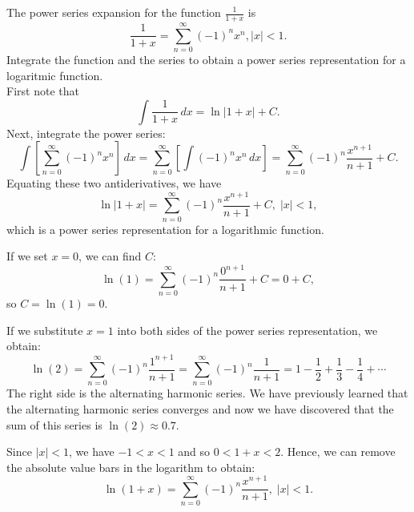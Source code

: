\documentclass[handout]{ximera}
\begin{document}
\begin{example}[example 2]
The power series expansion for the function $\frac{1}{1+x}$ is 
\[
\frac{1}{1+x} = \sum_{n=0}^\infty (-1)^n x^n, |x| < 1.
\]
Integrate the function and the series to obtain a power series representation for a logaritmic function.\\
First note that
\[
\int \frac{1}{1+x} \, dx = \ln|1+x| + C.
\]
Next, integrate the power series:
\[
\int \left[\sum_{n=0}^\infty (-1)^n x^n \right] \, dx =  \sum_{n=0}^\infty \left[ \int(-1)^n x^n \, dx \right] = \sum_{n=0}^\infty  (-1)^n \frac{x^{n+1}}{n+1} +C.
\]
Equating these two antiderivatives, we have
\[
\ln|1+x| = \sum_{n=0}^\infty  (-1)^n \frac{x^{n+1}}{n+1} +C, \; |x| < 1,
\]
which is a power series representation for a logarithmic function.

\begin{remark}[Remark 1]
If we set $x = 0$, we can find $C$:
\[
\ln(1) = \sum_{n=0}^\infty  (-1)^n \frac{0^{n+1}}{n+1} +C = 0 + C,
\]
so $C = \ln(1) = 0$.
\end{remark}

\begin{remark}[Remark 2]
If we substitute $x = 1$ into both sides of the power series representation, we obtain:
\[
\ln(2) = \sum_{n=0}^\infty  (-1)^n \frac{1^{n+1}}{n+1} = \sum_{n=0}^\infty  (-1)^n \frac{1}{n+1} = 1 - \frac12 + \frac13 - \frac14 + \cdots
\]
The right side is the alternating harmonic series. We have previously learned that the alternating harmonic series converges 
and now we have discovered that the sum of this series is $\ln(2) \approx 0.7$.
\end{remark}

\begin{remark}[Remark 3]
Since $|x|<1$, we have $-1 < x< 1$ and so $0 < 1+x < 2$. Hence, we can remove the absolute value bars in the logarithm to obtain:
\[
\ln(1+x) = \sum_{n=0}^\infty  (-1)^n \frac{x^{n+1}}{n+1}, \; |x| < 1.
\]
\end{remark}

\end{example}
\end{document}
